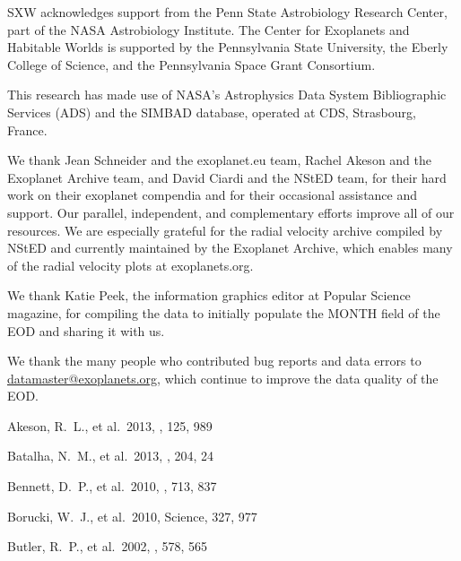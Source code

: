 \documentclass[11pt,preprint]{aastex}
\begin{document}
\begin{CJK*}{UTF8}{gbsn}
SXW acknowledges support from the Penn State Astrobiology Research
Center, part of the NASA Astrobiology Institute. The Center for
Exoplanets and Habitable Worlds is supported by the 
Pennsylvania State University, the Eberly College of Science, and the
Pennsylvania Space Grant Consortium.

This research has made use of
NASA's Astrophysics Data System Bibliographic Services (ADS) and the SIMBAD database,
operated at CDS, Strasbourg, France. 

We thank Jean Schneider and the exoplanet.eu team, Rachel Akeson
and the Exoplanet Archive team, and David Ciardi and the NStED team,
for their hard work on their exoplanet compendia and for their
occasional assistance and support.  Our parallel,
independent, and complementary efforts improve all of our resources.
We are especially grateful for the radial velocity archive compiled by
NStED and currently maintained by the Exoplanet Archive, which enables
many of the radial velocity plots at exoplanets.org.

We thank Katie Peek, the information graphics editor at Popular
Science magazine, for compiling the data to initially populate the
MONTH field of the EOD and sharing it with us.

We thank the many people who contributed bug reports and data
errors to \url{datamaster@exoplanets.org}, which continue to improve
the data quality of the EOD.   



%
\begin{thebibliography}

 Akeson, R.~L., et al.\ 2013, 
\pasp, 125, 989 %

 Batalha, N.~M., et al.\ 2013, 
\apjs, 204, 24 %

 Bennett, D.~P., et al.\ 2010, 
\apj, 713, 837 %

 Borucki, W.~J., et al.\ 2010, 
Science, 327, 977 %

 Butler, R.~P., et al.\ 2002, 
\apj, 578, 565 %


\end{thebibliography}
\end{CJK*}
\end{document}

